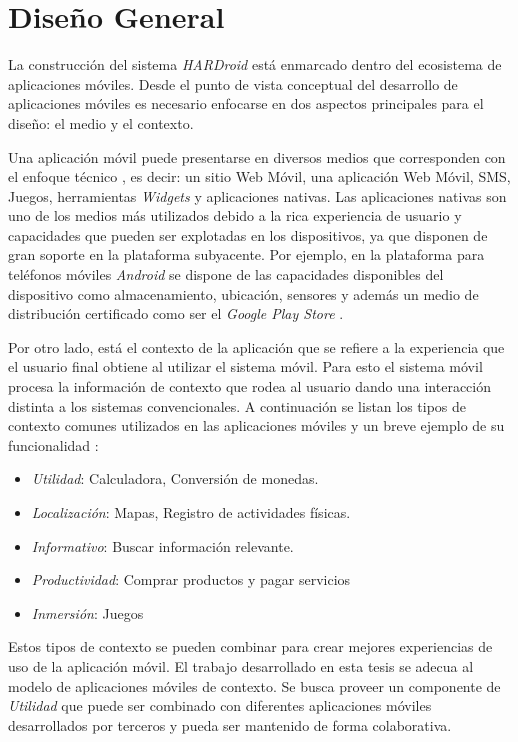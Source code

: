 \section{Diseño General}

\label{sec52:dise=0000F1o}La construcción del sistema \emph{HARDroid
}está enmarcado dentro del ecosistema de aplicaciones móviles. Desde
el punto de vista conceptual del desarrollo de aplicaciones móviles
es necesario enfocarse en dos aspectos principales para el diseño:
el medio y el contexto.

Una aplicación móvil puede presentarse en diversos medios que corresponden
con el enfoque técnico \cite{Fling2009}, es decir: un sitio Web Móvil,
una aplicación Web Móvil, SMS, Juegos, herramientas\emph{ Widgets}
y aplicaciones nativas. Las aplicaciones nativas son uno de los medios
más utilizados debido a la rica experiencia de usuario y capacidades
que pueden ser explotadas en los dispositivos, ya que disponen de
gran soporte en la plataforma subyacente. Por ejemplo, en la plataforma
para teléfonos móviles \emph{Android }se dispone de las capacidades
disponibles del dispositivo como almacenamiento, ubicación, sensores
y además un medio de distribución certificado como ser el \emph{Google
Play Store} \cite{Google2016p}. 

Por otro lado, está el contexto de la aplicación que se refiere a
la experiencia que el usuario final obtiene al utilizar el sistema
móvil. Para esto el sistema móvil procesa la información de contexto
que rodea al usuario dando una interacción distinta a los sistemas
convencionales. A continuación se listan los tipos de contexto comunes
utilizados en las aplicaciones móviles y un breve ejemplo de su funcionalidad
\cite{Fling2009}:
\begin{itemize}
\item \emph{Utilidad}: Calculadora, Conversión de monedas.
\item \emph{Localización}: Mapas, Registro de actividades físicas.
\item \emph{Informativo}: Buscar información relevante.
\item \emph{Productividad}: Comprar productos y pagar servicios
\item \emph{Inmersión}: Juegos 
\end{itemize}
Estos tipos de contexto se pueden combinar para crear mejores experiencias
de uso de la aplicación móvil. El trabajo desarrollado en esta tesis
se adecua al modelo de aplicaciones móviles de contexto. Se busca
proveer un componente de \emph{Utilidad} que puede ser combinado con
diferentes aplicaciones móviles desarrollados por terceros y pueda
ser mantenido de forma colaborativa. 

